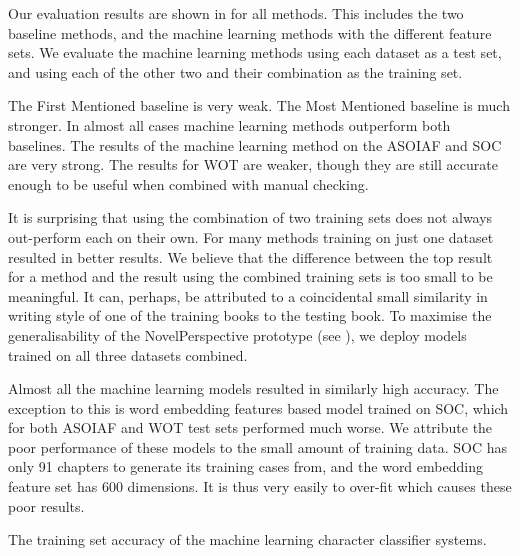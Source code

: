 \documentclass[]{book}
\begin{document}
Our evaluation results are shown in  for all methods.
This includes the two baseline methods, and the machine learning methods with the different feature sets.
We evaluate the machine learning methods using each dataset as a test set, and using each of the other two and their combination as the training set.

The First Mentioned baseline is very weak.
The Most Mentioned baseline is much stronger.
In almost all cases machine learning methods outperform both baselines.
The results of the machine learning method on the ASOIAF and SOC are very strong.
The results for WOT are weaker, though they are still accurate enough to be useful when combined with manual checking.


It is surprising that using the combination of two training sets does not always out-perform each on their own.
For many methods training on just one dataset resulted in better results.
We believe that the difference between the top result for a method and the result using the combined training sets is too small to be meaningful.
It can, perhaps, be attributed to a coincidental small similarity in writing style of one of the training books to the testing book.
To maximise the generalisability of the NovelPerspective prototype (see ), we deploy models trained on all three datasets combined.

Almost all the machine learning models resulted in similarly high accuracy.
The exception to this is word embedding features based model trained on SOC, which for both ASOIAF and WOT test sets performed much worse.
We attribute the poor performance of these models to the small amount of training data.
SOC has only 91 chapters to generate its training cases from, and the word embedding feature set has 600 dimensions.
It is thus very easily to over-fit which causes these poor results.


\begin{table}
	\begin{adjustbox}{max width=\columnwidth}
		\small
		
	\end{adjustbox}
	
	\caption{The training set accuracy of the machine learning character classifier systems.
	} \label{tbl:restrain}
\end{table}
\end{document}
